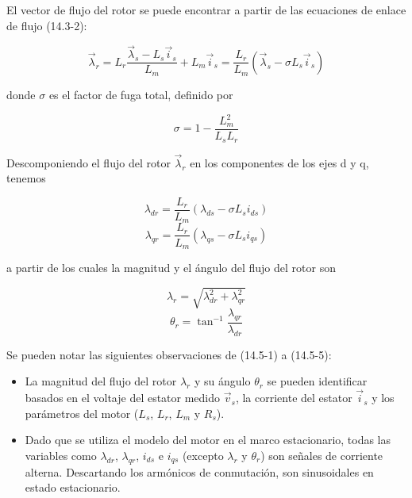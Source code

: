 \documentclass[letterpaper,12pt]{article}
\begin{document}
El vector de flujo del rotor se puede encontrar a partir de las ecuaciones de enlace de flujo (14.3-2):

\begin{equation}
\vec{\lambda}_r = L_r \frac{\vec{\lambda}_s - L_s \vec{i}_s}{L_m} + L_m \vec{i}_s = \frac{L_r}{L_m} (\vec{\lambda}_s - \sigma L_s \vec{i}_s) \tag{14.5-2}
\end{equation}

donde $\sigma$ es el factor de fuga total, definido por

\begin{equation}
\sigma = 1 - \frac{L_m^2}{L_s L_r} \tag{14.5-3}
\end{equation}

Descomponiendo el flujo del rotor $\vec{\lambda}_r$ en los componentes de los ejes d y q, tenemos

\begin{equation}
\lambda_{dr} = \frac{L_r}{L_m} (\lambda_{ds} - \sigma L_s i_{ds}) \tag{14.5-4}
\end{equation}
\begin{equation}
\lambda_{qr} = \frac{L_r}{L_m} (\lambda_{qs} - \sigma L_s i_{qs}) \tag{14.5-4}
\end{equation}

a partir de los cuales la magnitud y el ángulo del flujo del rotor son

\begin{equation}
\lambda_r = \sqrt{\lambda_{dr}^2 + \lambda_{qr}^2} \tag{14.5-5}
\end{equation}
\begin{equation}
\theta_r = \tan^{-1} \frac{\lambda_{qr}}{\lambda_{dr}} \tag{14.5-5}
\end{equation}

Se pueden notar las siguientes observaciones de (14.5-1) a (14.5-5):

\begin{itemize}
    \item La magnitud del flujo del rotor $\lambda_r$ y su ángulo $\theta_r$ se pueden identificar basados en el voltaje del estator medido $\vec{v}_s$, la corriente del estator $\vec{i}_s$ y los parámetros del motor ($L_s$, $L_r$, $L_m$ y $R_s$).
    \item Dado que se utiliza el modelo del motor en el marco estacionario, todas las variables como $\lambda_{dr}$, $\lambda_{qr}$, $i_{ds}$ e $i_{qs}$ (excepto $\lambda_r$ y $\theta_r$) son señales de corriente alterna. Descartando los armónicos de conmutación, son sinusoidales en estado estacionario.
\end{itemize}
\end{document}

